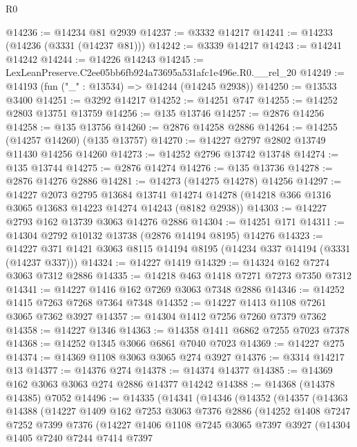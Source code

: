 \begin{lexlean}{R0}
\begin{coremodule}
@14236 := @14234 @81 @2939
@14237 := @3332 @14217
@14241 := @14233 (@14236 (@3331 (@14237 @81)))
@14242 := @3339 @14217
@14243 := @14241 @14242
@14244 := @14226 @14243
@14245 := LexLeanPreserve.C2ee05bb6fb924a73695a531afc1e496e.R0.__rel_20
@14249 := @14193 (fun ("_" : @13534) => @14244 (@14245 @2938))
@14250 := @13533 @3400
@14251 := @3292 @14217
@14252 := @14251 @747
@14255 := @14252 @2803 @13751 @13759
@14256 := @135 @13746
@14257 := @2876 @14256
@14258 := @135 @13756
@14260 := @2876 @14258 @2886
@14264 := @14255 (@14257 @14260) (@135 @13757)
@14270 := @14227 @2797 @2802 @13749 @11430 @14256 @14260
@14273 := @14252 @2796 @13742 @13748
@14274 := @135 @13744
@14275 := @2876 @14274
@14276 := @135 @13736
@14278 := @2876 @14276 @2886
@14281 := @14273 (@14275 @14278) @14256
@14297 := @14227
    @2073
    @2795
    @13684
    @13741
    @14274
    @14278
    (@14218 @366 @1316 @3065 @13683 @14223 @14274 @14243 (@8182 @2938))
@14303 := @14227 @2793 @162 @13739 @3063 @14276 @2886
@14304 := @14251 @171
@14311 := @14304 @2792 @10132 @13738 (@2876 @14194 @8195) @14276
@14323 := @14227 @371 @1421 @3063 @8115 @14194 @8195 (@14234 @337 @14194 (@3331 (@14237 @337)))
@14324 := @14227 @1419
@14329 := @14324 @162 @7274 @3063 @7312 @2886
@14335 := @14218 @463 @1418 @7271 @7273 @7350 @7312
@14341 := @14227 @1416 @162 @7269 @3063 @7348 @2886
@14346 := @14252 @1415 @7263 @7268 @7364 @7348
@14352 := @14227 @1413 @1108 @7261 @3065 @7362 @3927
@14357 := @14304 @1412 @7256 @7260 @7379 @7362
@14358 := @14227 @1346
@14363 := @14358 @1411 @6862 @7255 @7023 @7378
@14368 := @14252 @1345 @3066 @6861 @7040 @7023
@14369 := @14227 @275
@14374 := @14369 @1108 @3063 @3065 @274 @3927
@14376 := @3314 @14217 @13
@14377 := @14376 @274
@14378 := @14374 @14377
@14385 := @14369 @162 @3063 @3063 @274 @2886 @14377 @14242
@14388 := @14368 (@14378 @14385) @7052
@14496 := @14335
    (@14341
      (@14346
        (@14352
          (@14357
            (@14363
              @14388
              (@14227
                @1409
                @162
                @7253
                @3063
                @7376
                @2886
                (@14252
                  @1408
                  @7247
                  @7252
                  @7399
                  @7376
                  (@14227
                    @1406
                    @1108
                    @7245
                    @3065
                    @7397
                    @3927
                    (@14304
                      @1405
                      @7240
                      @7244
                      @7414
                      @7397

\end{coremodule}
\end{lexlean}
